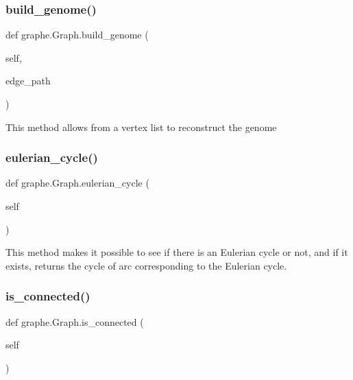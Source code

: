 \subsubsection{\texorpdfstring{build\+\_\+genome()}{build\_genome()}}
{\footnotesize\ttfamily def graphe.\+Graph.\+build\+\_\+genome (\begin{DoxyParamCaption}\item[{}]{self,  }\item[{}]{edge\+\_\+path }\end{DoxyParamCaption})}

\begin{DoxyVerb}This method allows from a vertex list to reconstruct the genome
\end{DoxyVerb}
 \mbox{\label{classgraphe_1_1Graph_a83fff8017d68d9414413f1a90873e1f8}} 
\subsubsection{\texorpdfstring{eulerian\+\_\+cycle()}{eulerian\_cycle()}}
{\footnotesize\ttfamily def graphe.\+Graph.\+eulerian\+\_\+cycle (\begin{DoxyParamCaption}\item[{}]{self }\end{DoxyParamCaption})}

\begin{DoxyVerb}This method makes it possible to see if there is an Eulerian cycle or not, and if it exists, returns the cycle of arc corresponding to the Eulerian cycle.
\end{DoxyVerb}
 \mbox{\label{classgraphe_1_1Graph_a6d0519dfdd5684ee06e5459703682e53}} 
\subsubsection{\texorpdfstring{is\+\_\+connected()}{is\_connected()}}
{\footnotesize\ttfamily def graphe.\+Graph.\+is\+\_\+connected (\begin{DoxyParamCaption}\item[{}]{self }\end{DoxyParamCaption})}

